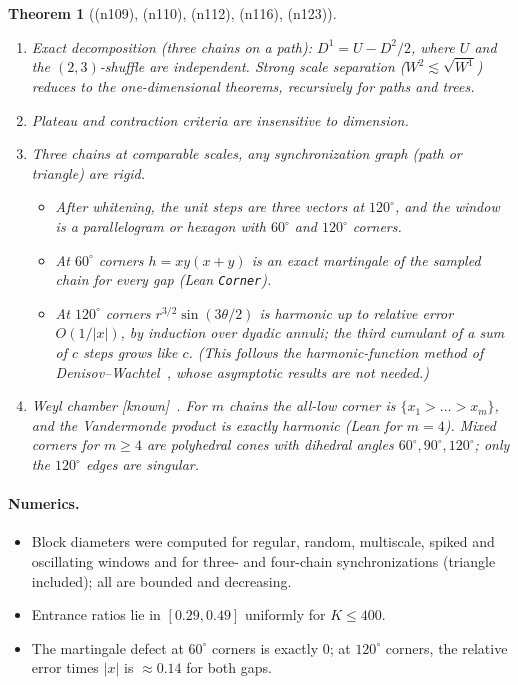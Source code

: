 \documentclass[11pt]{article}
\newtheorem{theorem}{Theorem}[section]
\theoremstyle{definition}
\theoremstyle{remark}
\newcommand{\lean}[1]{\texttt{#1}}
\newcommand{\status}[1]{\textsf{[#1]}}
\newcommand{\note}[1]{\textsf{(n#1)}}
\begin{document}
\begin{theorem}[\note{109}, \note{110}, \note{112}, \note{116}, \note{123}]\label{thm:multi}
\leavevmode
\begin{enumerate}
\item \emph{Exact decomposition} (three chains on a path): $D^1=U-D^2/2$, where $U$ and the $(2,3)$-shuffle are independent. \emph{Strong scale separation} ($W^2\lesssim\sqrt{W^1}$) reduces to the one-dimensional theorems, recursively for paths and trees.
\item Plateau and contraction criteria are insensitive to dimension.
\item \emph{Three chains at comparable scales, any synchronization graph} (path or triangle) are rigid.
  \begin{itemize}
  \item After whitening, the unit steps are three vectors at $120^\circ$, and the window is a parallelogram or hexagon with $60^\circ$ and $120^\circ$ corners.
  \item At $60^\circ$ corners $h=xy(x+y)$ is an \emph{exact} martingale of the sampled chain for every gap (Lean \lean{Corner}).
  \item At $120^\circ$ corners $r^{3/2}\sin(3\theta/2)$ is harmonic up to relative error $O(1/|x|)$, by induction over dyadic annuli; the third cumulant of a sum of $c$ steps grows like $c$. (This follows the harmonic-function method of Denisov--Wachtel~\cite{DenisovWachtel15}, whose asymptotic results are not needed.)
  \end{itemize}
\item \emph{Weyl chamber} \status{known}~\cite{KOR02}. For $m$ chains the all-low corner is $\{x_1>\dots>x_m\}$, and the Vandermonde product is exactly harmonic (Lean for $m=4$). Mixed corners for $m\ge4$ are polyhedral cones with dihedral angles $60^\circ,90^\circ,120^\circ$; only the $120^\circ$ edges are singular.
\end{enumerate}
\end{theorem}

\paragraph{Numerics.}
\begin{itemize}
\item Block diameters were computed for regular, random, multiscale, spiked and oscillating windows and for three- and four-chain synchronizations (triangle included); all are bounded and decreasing.
\item Entrance ratios lie in $[0.29,0.49]$ uniformly for $K\le400$.
\item The martingale defect at $60^\circ$ corners is exactly $0$; at $120^\circ$ corners, the relative error times $|x|$ is $\approx0.14$ for both gaps.
\end{itemize}
\end{document}
